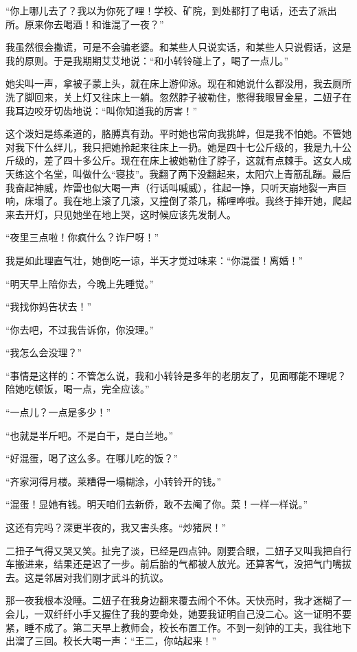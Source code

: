  “你上哪儿去了？我以为你死了哩！学校、矿院，到处都打了电话，还去了派出所。原来你去喝酒！和谁混了一夜？” 
 
 我虽然很会撒谎，可是不会骗老婆。和某些人只说实话，和某些人只说假话，这是我的原则。于是我期期艾艾地说：“和小转铃碰上了，喝了一点儿。” 
 
 她尖叫一声，拿被子蒙上头，就在床上游仰泳。现在和她说什么都没用，我去厕所洗了脚回来，关上灯又往床上一躺。忽然脖子被勒住，憋得我眼冒金星，二妞子在我耳边咬牙切齿地说：“叫你知道我的厉害！” 
 
 这个泼妇是练柔道的，胳膊真有劲。平时她也常向我挑衅，但是我不怕她。不管她对我下什么绊儿，我只把她拎起来往床上一扔。她是四十七公斤级的，我是九十公斤级的，差了四十多公斤。现在在床上被她勒住了脖子，这就有点棘手。这女人成天练这个名堂，叫做什么“寝技”。我翻了两下没翻起来，太阳穴上青筋乱蹦。最后我奋起神威，炸雷也似大喝一声（行话叫喊威），往起一挣，只听天崩地裂一声巨响，床塌了。我在地上滚了几滚，又撞倒了茶几，稀哩哗啦。我终于摔开她，爬起来去开灯，只见她坐在地上哭，这时候应该先发制人。 
 
 “夜里三点啦！你疯什么？诈尸呀！” 
 
 我是如此理直气壮，她倒吃一谅，半天才觉过味来：“你混蛋！离婚！” 
 
 “明天早上陪你去，今晚上先睡觉。” 
 
 “我找你妈告状去！” 
 
 “你去吧，不过我告诉你，你没理。” 
 
 “我怎么会没理？” 
 
 “事情是这样的：不管怎么说，我和小转铃是多年的老朋友了，见面哪能不理呢？陪她吃顿饭，喝一点，完全应该。” 
 
 “一点儿？一点是多少！” 
 
 “也就是半斤吧。不是白干，是白兰地。” 
 
 “好混蛋，喝了这么多。在哪儿吃的饭？” 
 
 “齐家河得月楼。莱糟得一塌糊涂，小转铃开的钱。” 
 
 “混蛋！显她有钱。明天咱们去新侨，敢不去阉了你。菜！一样一样说。” 
 
 这还有完吗？深更半夜的，我又害头疼。“炒猪屄！” 
 
 二扭子气得又哭又笑。扯完了淡，已经是四点钟。刚要合眼，二妞子又叫我把自行车搬进来，结果还是迟了一步。前后胎的气都被人放光。还算客气，没把气门嘴拔去。这是邻居对我们刚才武斗的抗议。 
 
 那一夜我根本没睡。二妞子在我身边翻来覆去闹个不休。天快亮时，我才迷糊了一会儿，一双纤纤小手又握住了我的要命处，她要我证明自己没二心。这一证明不要紧，睡不成了。第二天早上教师会，校长布置工作。不到一刻钟的工夫，我往地下出溜了三回。校长大喝一声：“王二，你站起来！” 
 
